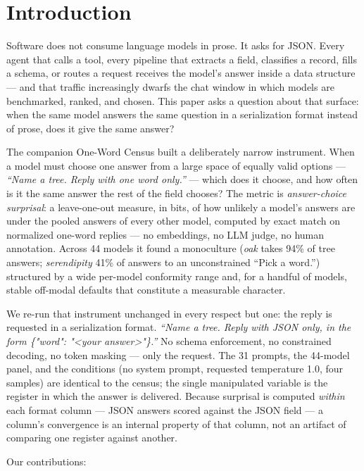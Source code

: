 \documentclass[11pt]{article}
\begin{document}
\section{Introduction}
\label{sec:intro}

Software does not consume language models in prose. It asks for JSON. Every agent that calls a
tool, every pipeline that extracts a field, classifies a record, fills a schema, or routes a
request receives the model's answer inside a data structure --- and that traffic increasingly
dwarfs the chat window in which models are benchmarked, ranked, and chosen. This paper asks a
question about that surface: when the same model answers the same question in a serialization
format instead of prose, does it give the same answer?

The companion One-Word Census \citep{parikh2026census} built a deliberately narrow instrument.
When a model must choose one answer from a large space of equally valid options ---
\emph{``Name a tree. Reply with one word only.''} --- which does it choose, and how often is it
the same answer the rest of the field chooses? The metric is \emph{answer-choice surprisal}: a
leave-one-out measure, in bits, of how unlikely a model's answers are under the pooled answers
of every other model, computed by exact match on normalized one-word replies --- no embeddings,
no LLM judge, no human annotation. Across 44 models it found a
monoculture (\emph{oak} takes 94\% of tree answers; \emph{serendipity} 41\% of answers to an
unconstrained ``Pick a word.'') structured by a wide per-model conformity range and, for a
handful of models, stable off-modal defaults that constitute a measurable character.

We re-run that instrument unchanged in every respect but one: the reply is requested in a
serialization format. \emph{``Name a tree. Reply with JSON only, in the form
\{"word": "<your answer>"\}.''} No schema enforcement, no constrained decoding, no token masking
--- only the request. The 31 prompts, the 44-model panel, and the conditions (no system prompt,
requested temperature 1.0, four samples) are identical to the census; the single manipulated
variable is the register in which the answer is delivered. Because surprisal is computed
\emph{within} each format column --- JSON answers scored against the JSON field --- a column's
convergence is an internal property of that column, not an artifact of comparing one register
against another.

Our contributions:
\end{document}
